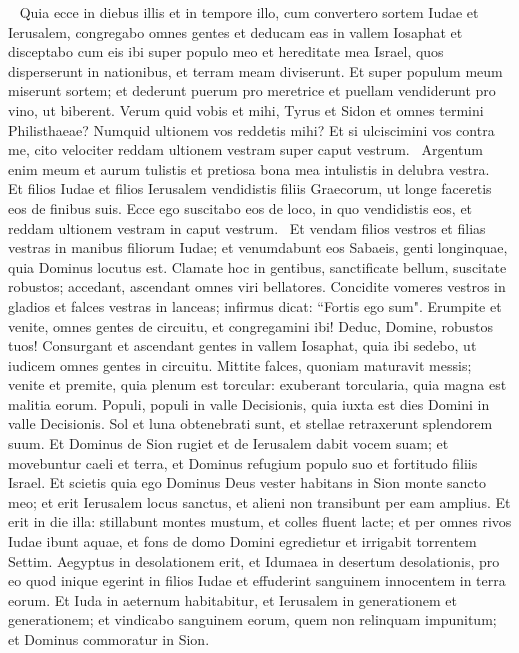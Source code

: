 \begin{biblechapter}   
\verse Quia ecce in diebus illis et in tempore illo, cum convertero sortem Iudae et Ierusalem, 
\verse congregabo omnes gentes et deducam eas in vallem Iosaphat et disceptabo cum eis ibi super populo meo et hereditate mea Israel, quos disperserunt in nationibus, et terram meam diviserunt. 
\verse Et super populum meum miserunt sortem; et dederunt puerum pro meretrice et puellam vendiderunt pro vino, ut biberent. 
\verse Verum quid vobis et mihi, Tyrus et Sidon et omnes termini Philisthaeae? Numquid ultionem vos reddetis mihi? Et si ulciscimini vos contra me, cito velociter reddam ultionem vestram super caput vestrum.  
\verse Argentum enim meum et aurum tulistis et pretiosa bona mea intulistis in delubra vestra.  
\verse Et filios Iudae et filios Ierusalem vendidistis filiis Graecorum, ut longe faceretis eos de finibus suis.
\verse Ecce ego suscitabo eos de loco, in quo vendidistis eos, et reddam ultionem vestram in caput vestrum.  
\verse Et vendam filios vestros et filias vestras in manibus filiorum Iudae; et venumdabunt eos Sabaeis, genti longinquae, quia Dominus locutus est. 
\verse Clamate hoc in gentibus, sanctificate bellum, suscitate robustos; accedant, ascendant omnes viri bellatores. 
\verse Concidite vomeres vestros in gladios et falces vestras in lanceas; infirmus dicat: “Fortis ego sum". 
\verse Erumpite et venite, omnes gentes de circuitu, et congregamini ibi! Deduc, Domine, robustos tuos! 
\verse Consurgant et ascendant gentes in vallem Iosaphat, quia ibi sedebo, ut iudicem omnes gentes in circuitu. 
\verse Mittite falces, quoniam maturavit messis; venite et premite, quia plenum est torcular: exuberant torcularia, quia magna est malitia eorum. 
\verse Populi, populi in valle Decisionis, quia iuxta est dies Domini in valle Decisionis. 
\verse Sol et luna obtenebrati sunt, et stellae retraxerunt splendorem suum. 
\verse Et Dominus de Sion rugiet et de Ierusalem dabit vocem suam; et movebuntur caeli et terra, et Dominus refugium populo suo et fortitudo filiis Israel. 
\verse Et scietis quia ego Dominus Deus vester habitans in Sion monte sancto meo; et erit Ierusalem locus sanctus, et alieni non transibunt per eam amplius. 
\verse Et erit in die illa: stillabunt montes mustum, et colles fluent lacte; et per omnes rivos Iudae ibunt aquae, et fons de domo Domini egredietur et irrigabit torrentem Settim. 
\verse Aegyptus in desolationem erit, et Idumaea in desertum desolationis, pro eo quod inique egerint in filios Iudae et effuderint sanguinem innocentem in terra eorum. 
\verse Et Iuda in aeternum habitabitur, et Ierusalem in generationem et generationem; 
\verse et vindicabo sanguinem eorum, quem non relinquam impunitum; et Dominus commoratur in Sion.
\end{biblechapter}
